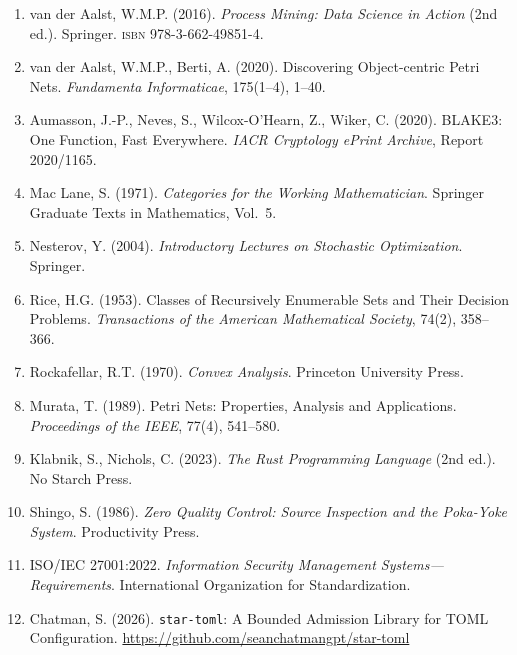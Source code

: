 \documentclass[12pt, letterpaper]{report}
\theoremstyle{plain}
\theoremstyle{definition}
\theoremstyle{remark}
\begin{document}
\begin{enumerate}
\item
van der Aalst, W.M.P. (2016).
\textit{Process Mining: Data Science in Action} (2nd ed.).
Springer. \textsc{isbn} 978-3-662-49851-4.

\item
van der Aalst, W.M.P., Berti, A. (2020).
Discovering Object-centric Petri Nets.
\textit{Fundamenta Informaticae}, 175(1--4), 1--40.

\item
Aumasson, J.-P., Neves, S., Wilcox-O'Hearn, Z., Wiker, C. (2020).
BLAKE3: One Function, Fast Everywhere.
\textit{IACR Cryptology ePrint Archive}, Report 2020/1165.

\item
Mac Lane, S. (1971).
\textit{Categories for the Working Mathematician}.
Springer Graduate Texts in Mathematics, Vol.\ 5.

\item
Nesterov, Y. (2004).
\textit{Introductory Lectures on Stochastic Optimization}.
Springer.

\item
Rice, H.G. (1953).
Classes of Recursively Enumerable Sets and Their Decision Problems.
\textit{Transactions of the American Mathematical Society},
74(2), 358--366.

\item
Rockafellar, R.T. (1970).
\textit{Convex Analysis}.
Princeton University Press.

\item
Murata, T. (1989).
Petri Nets: Properties, Analysis and Applications.
\textit{Proceedings of the IEEE}, 77(4), 541--580.

\item
Klabnik, S., Nichols, C. (2023).
\textit{The Rust Programming Language} (2nd ed.).
No Starch Press.

\item
Shingo, S. (1986).
\textit{Zero Quality Control: Source Inspection and the Poka-Yoke System}.
Productivity Press.

\item
ISO/IEC 27001:2022.
\textit{Information Security Management Systems---Requirements}.
International Organization for Standardization.

\item
Chatman, S. (2026).
\texttt{star-toml}: A Bounded Admission Library for TOML Configuration.
\url{https://github.com/seanchatmangpt/star-toml}
\end{enumerate}
\end{document}
